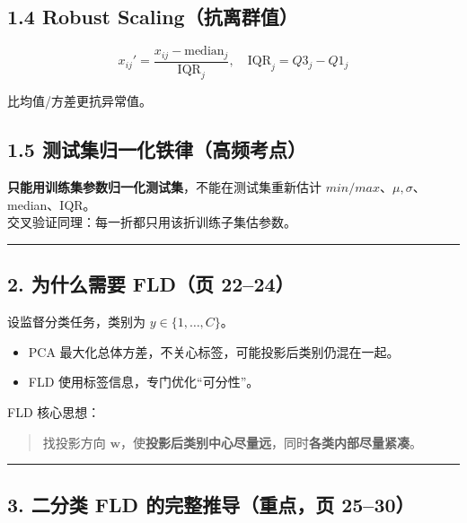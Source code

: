 \documentclass[
]{article}
\providecommand{\tightlist}{%
  \setlength{\itemsep}{0pt}\setlength{\parskip}{0pt}}
\begin{document}
\subsection{1.4 Robust
Scaling（抗离群值）}\label{robust-scalingux6297ux79bbux7fa4ux503c}

\[
x_{ij}'=\frac{x_{ij}-\mathrm{median}_j}{\mathrm{IQR}_j},
\quad \mathrm{IQR}_j=Q3_j-Q1_j
\]

比均值/方差更抗异常值。

\subsection{1.5
测试集归一化铁律（高频考点）}\label{ux6d4bux8bd5ux96c6ux5f52ux4e00ux5316ux94c1ux5f8bux9ad8ux9891ux8003ux70b9}

\textbf{只能用训练集参数归一化测试集}，不能在测试集重新估计
\(min/max\)、\(\mu,\sigma\)、median、IQR。\\
交叉验证同理：每一折都只用该折训练子集估参数。

\begin{center}\rule{0.5\linewidth}{0.5pt}\end{center}

\subsection{2. 为什么需要 FLD（页
22--24）}\label{ux4e3aux4ec0ux4e48ux9700ux8981-fldux9875-2224}

设监督分类任务，类别为 \(y\in\{1,\dots,C\}\)。

\begin{itemize}
\tightlist
\item
  PCA 最大化总体方差，不关心标签，可能投影后类别仍混在一起。
\item
  FLD 使用标签信息，专门优化``可分性''。
\end{itemize}

FLD 核心思想：

\begin{quote}
找投影方向
\(\mathbf{w}\)，使\textbf{投影后类别中心尽量远}，同时\textbf{各类内部尽量紧凑}。
\end{quote}

\begin{center}\rule{0.5\linewidth}{0.5pt}\end{center}

\subsection{3. 二分类 FLD 的完整推导（重点，页
25--30）}\label{ux4e8cux5206ux7c7b-fld-ux7684ux5b8cux6574ux63a8ux5bfcux91cdux70b9ux9875-2530}
\end{document}
